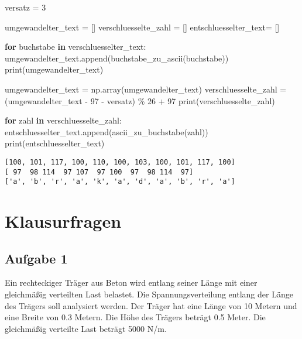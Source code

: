 \documentclass[
  letterpaper,
  DIV=11,
  numbers=noendperiod]{scrreprt}
\newenvironment{Shaded}{\begin{snugshade}}{\end{snugshade}}
\newcommand{\BuiltInTok}[1]{\textcolor[rgb]{0.00,0.23,0.31}{#1}}
\newcommand{\ControlFlowTok}[1]{\textcolor[rgb]{0.00,0.23,0.31}{\textbf{#1}}}
\newcommand{\DecValTok}[1]{\textcolor[rgb]{0.68,0.00,0.00}{#1}}
\newcommand{\KeywordTok}[1]{\textcolor[rgb]{0.00,0.23,0.31}{\textbf{#1}}}
\newcommand{\NormalTok}[1]{\textcolor[rgb]{0.00,0.23,0.31}{#1}}
\newcommand{\OperatorTok}[1]{\textcolor[rgb]{0.37,0.37,0.37}{#1}}
\begin{document}
\begin{tcolorbox}
\begin{tcolorbox}
\begin{tcolorbox}
\begin{Shaded}
\begin{Highlighting}[]
\NormalTok{versatz }\OperatorTok{=} \DecValTok{3}

\NormalTok{umgewandelter\_text }\OperatorTok{=}\NormalTok{ []}
\NormalTok{verschluesselte\_zahl }\OperatorTok{=}\NormalTok{ []}
\NormalTok{entschluesselter\_text}\OperatorTok{=}\NormalTok{ []}



\ControlFlowTok{for}\NormalTok{ buchstabe }\KeywordTok{in}\NormalTok{ verschluesselter\_text:}
\NormalTok{    umgewandelter\_text.append(buchstabe\_zu\_ascii(buchstabe))}
\BuiltInTok{print}\NormalTok{(umgewandelter\_text)}

\NormalTok{umgewandelter\_text }\OperatorTok{=}\NormalTok{ np.array(umgewandelter\_text)}
\NormalTok{verschluesselte\_zahl }\OperatorTok{=}\NormalTok{ (umgewandelter\_text }\OperatorTok{{-}} \DecValTok{97} \OperatorTok{{-}}\NormalTok{ versatz) }\OperatorTok{\%} \DecValTok{26} \OperatorTok{+} \DecValTok{97}
\BuiltInTok{print}\NormalTok{(verschluesselte\_zahl)}

\ControlFlowTok{for}\NormalTok{ zahl }\KeywordTok{in}\NormalTok{ verschluesselte\_zahl:    }
\NormalTok{    entschluesselter\_text.append(ascii\_zu\_buchstabe(zahl))}
\BuiltInTok{print}\NormalTok{(entschluesselter\_text)}
\end{Highlighting}
\end{Shaded}

\begin{verbatim}
[100, 101, 117, 100, 110, 100, 103, 100, 101, 117, 100]
[ 97  98 114  97 107  97 100  97  98 114  97]
['a', 'b', 'r', 'a', 'k', 'a', 'd', 'a', 'b', 'r', 'a']
\end{verbatim}

\end{tcolorbox}

\end{tcolorbox}

\chapter{Klausurfragen}\label{klausurfragen}

\section*{Aufgabe 1}\label{aufgabe-1-2}


Ein rechteckiger Träger aus Beton wird entlang seiner Länge mit einer
gleichmäßig verteilten Last belastet. Die Spannungsverteilung entlang
der Länge des Trägers soll analysiert werden. Der Träger hat eine Länge
von 10 Metern und eine Breite von 0.3 Metern. Die Höhe des Trägers
beträgt 0.5 Meter. Die gleichmäßig verteilte Last beträgt 5000 N/m.


\end{tcolorbox}
\end{document}
